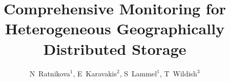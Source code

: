\documentclass[a4paper]{jpconf}
\begin{document}
\title{Comprehensive Monitoring for Heterogeneous Geographically Distributed Storage}

\author{N~Ratnikova$^1$, E~Karavakis$^2$, S~Lammel$^1$, T~Wildish$^3$}

\address{$^1$ Fermi National Accelerator Laboratory, US}
\address{$^2$ CERN, CH}
\address{$^3$ Princeton University, US}









% 
% 

\par

\end{document}
